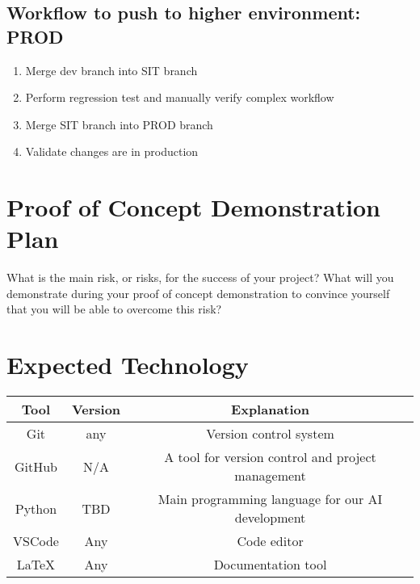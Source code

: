 \documentclass{article}
\begin{document}
\subsection{Workflow to push to higher environment: PROD}
\begin{enumerate}
    \item Merge dev branch into SIT branch
    \item Perform regression test and manually verify complex workflow
    \item Merge SIT branch into PROD branch
    \item Validate changes are in production
\end{enumerate}

\section{Proof of Concept Demonstration Plan}

What is the main risk, or risks, for the success of your project?  What will you
demonstrate during your proof of concept demonstration to convince yourself that
you will be able to overcome this risk?

\section{Expected Technology}



\begin{tabular}{|c|c|c|}
\hline
Tool   & Version & Explanation                                          \\
\hline
Git   & any  & Version control system                                   \\
\hline
GitHub & N/A     & A tool for version control and project management    \\
\hline
Python & TBD     & Main programming language for our AI development     \\
\hline
VSCode & Any     & Code editor                                          \\
\hline              
LaTeX  & Any     & Documentation tool                                   \\
\hline
\end{tabular}
\end{document}
